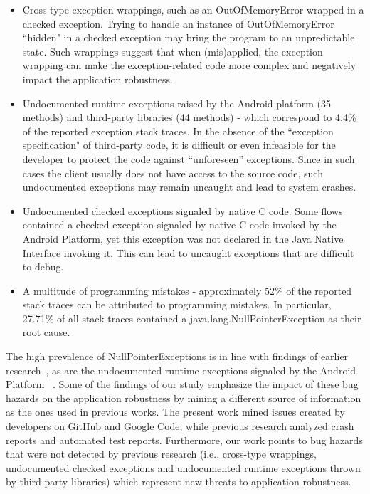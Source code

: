 \documentclass[conference]{IEEEtran}
\begin{document}
\begin{itemize}

   \item  Cross-type exception wrappings, such as an OutOfMemoryError wrapped in a checked exception.
Trying to handle an instance of OutOfMemoryError ``hidden" in  a checked exception may bring the program
 to an unpredictable state. Such wrappings suggest that when (mis)applied, the exception wrapping can make 
the exception-related code more complex and negatively impact the application robustness.

  \item  Undocumented runtime exceptions raised by the Android platform (35 methods) and  third-party libraries (44 methods) -
 which correspond to 4.4\% of the reported exception stack traces.
In the absence of the ``exception specification" of third-party code, it is difficult or 
even infeasible for the developer to protect the code against ``unforeseen'' exceptions. 
Since in such cases the client usually does not have access to the source code, such undocumented 
exceptions may remain uncaught and lead to system crashes. 

   \item Undocumented checked exceptions signaled by native C code.  Some flows contained a checked 
exception signaled by native C code invoked by the Android Platform, yet this exception was not declared
 in the Java Native Interface invoking it. This can lead to uncaught exceptions that are 
difficult to debug. 

 \item A multitude of programming mistakes - approximately 52\% of the reported stack traces can 
be attributed to programming mistakes. In particular, 27.71\% of all stack traces contained a java.lang.NullPointerException 
as their root cause.

\end{itemize}

 The high prevalence of NullPointerExceptions is in line with findings of earlier research~\cite{kim2013predicting,fraser20131600,csallner2004jcrasher}, as are the undocumented runtime 
exceptions signaled by the Android Platform ~\cite{kechagia2014}. 
Some of the findings of our
 study emphasize the impact of these bug hazards on the application robustness 
by mining a different source of information as the ones used in previous works. The present work 
mined issues created by developers on GitHub and Google Code, while  previous research analyzed crash reports and automated test reports.
 Furthermore, our work points to bug hazards that were not detected by previous research (i.e., cross-type wrappings, undocumented checked exceptions and undocumented runtime exceptions thrown by third-party libraries) which represent new threats to application robustness.
\end{document}
